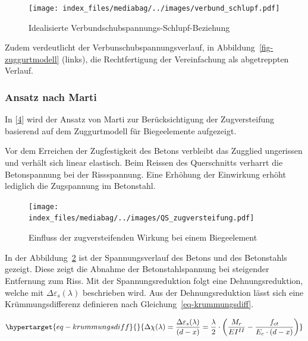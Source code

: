 \documentclass[
  12pt,
  letterpaper,
  egregdoesnotlikesansseriftitles]{scrreprt}
\begin{document}
\begin{figure}[H]

{\centering \texttt{[image: index\_files/mediabag/../images/verbund\_schlupf.pdf]}

}

\caption{\label{fig-verbund_schlupf}Idealisierte
Verbundschubspannungs-Schlupf-Beziehung}

\end{figure}

Zudem verdeutlicht der Verbunschubspannungsverlauf, in
Abbildung~\ref{fig-zuggurtmodell} (links), die Rechtfertigung der
Vereinfachung als abgetreppten Verlauf.

\hypertarget{ansatz-nach-marti}{%
\subsubsection{Ansatz nach Marti}\label{ansatz-nach-marti}}

In {[}\protect\hyperlink{ref-Spathelf2022}{4}{]} wird der Ansatz von
Marti zur Berücksichtigung der Zugversteifung basierend auf dem
Zuggurtmodell für Biegeelemente aufgezeigt.

Vor dem Erreichen der Zugfestigkeit des Betons verbleibt das Zugglied
ungerissen und verhält sich linear elastisch. Beim Reissen des
Querschnitts verharrt die Betonspannung bei der Rissspannung. Eine
Erhöhung der Einwirkung erhöht lediglich die Zugspannung im Betonstahl.

\begin{figure}[H]

{\centering \texttt{[image: index\_files/mediabag/../images/QS\_zugversteifung.pdf]}

}

\caption{\label{fig-einfluss_zugversteifung}Einfluss der
zugversteifenden Wirkung bei einem Biegeelement}

\end{figure}

In der Abbildung~\ref{fig-einfluss_zugversteifung} ist der
Spannungsverlauf des Betons und des Betonstahls gezeigt. Diese zeigt die
Abnahme der Betonstahlspannung bei steigender Entfernung zum Riss. Mit
der Spannungsreduktion folgt eine Dehnungsreduktion, welche mit
\(\Delta \varepsilon_s (\lambda)\) beschrieben wird. Aus der
Dehnungsreduktion lässt sich eine Krümmungsdifferenz definieren nach
Gleichung~\ref{eq-krummungsdiff}.

\begin{equation}\protect\hypertarget{eq-krummungsdiff}{}{
\Delta \chi(\lambda) = \frac{\Delta \varepsilon_s (\lambda)}{(d-x)} = \frac{\lambda}{2} \cdot \left ( \frac{M_r}{EI^{II}} - \frac{f_{ct}}{E_c\cdot(d-x)}\right )
}\label{eq-krummungsdiff}\end{equation}
\end{document}
